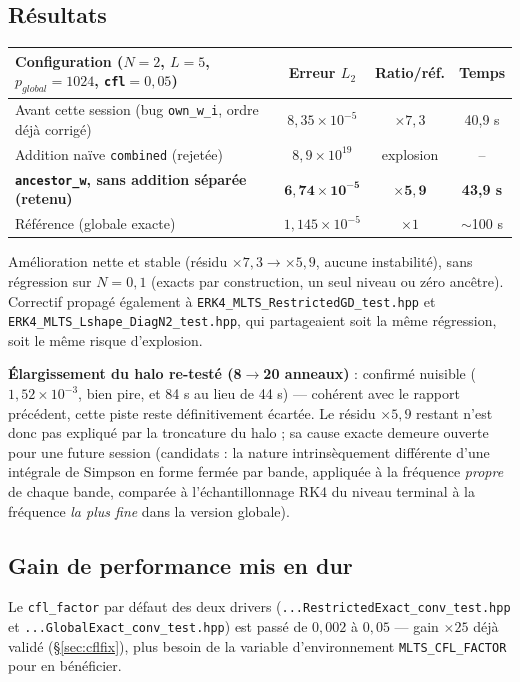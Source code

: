 \documentclass[11pt]{article}
\begin{document}
\subsection{Résultats}

\begin{center}
\begin{tabular}{@{}lccc@{}}
\toprule
Configuration ($N=2$, $L=5$, $p_{global}=1024$, \texttt{cfl}$=0{,}05$) & Erreur $L_2$ & Ratio/réf. & Temps \\
\midrule
Avant cette session (bug \texttt{own\_w\_i}, ordre déjà corrigé) & $8{,}35\times10^{-5}$ & $\times7{,}3$ & 40,9 s \\
Addition naïve \texttt{combined} (rejetée) & $8{,}9\times10^{19}$ & explosion & -- \\
\textbf{\texttt{ancestor\_w}, sans addition séparée (retenu)} & $\mathbf{6{,}74\times10^{-5}}$ & $\mathbf{\times5{,}9}$ & \textbf{43,9 s} \\
Référence (globale exacte) & $1{,}145\times10^{-5}$ & $\times1$ & $\sim$100 s \\
\bottomrule
\end{tabular}
\end{center}

Amélioration nette et stable (résidu $\times7{,}3\to\times5{,}9$, aucune
instabilité), sans régression sur $N=0,1$ (exacts par construction, un
seul niveau ou zéro ancêtre). Correctif propagé également à
\texttt{ERK4\_MLTS\_RestrictedGD\_test.hpp} et
\texttt{ERK4\_MLTS\_Lshape\_DiagN2\_test.hpp}, qui partageaient soit la
même régression, soit le même risque d'explosion.

\textbf{Élargissement du halo re-testé (8$\to$20 anneaux)} : confirmé
nuisible ($1{,}52\times10^{-3}$, bien pire, et 84 s au lieu de 44 s) ---
cohérent avec le rapport précédent, cette piste reste définitivement
écartée. Le résidu $\times5{,}9$ restant n'est donc pas expliqué par la
troncature du halo ; sa cause exacte demeure ouverte pour une future
session (candidats : la nature intrinsèquement différente d'une
intégrale de Simpson en forme fermée par bande, appliquée à la
fréquence \emph{propre} de chaque bande, comparée à l'échantillonnage
RK4 du niveau terminal à la fréquence \emph{la plus fine} dans la
version globale).

\subsection{Gain de performance mis en dur}

Le \texttt{cfl\_factor} par défaut des deux drivers
(\texttt{...RestrictedExact\_conv\_test.hpp} et
\texttt{...GlobalExact\_conv\_test.hpp}) est passé de $0{,}002$ à
$0{,}05$ --- gain $\times25$ déjà validé (\S\ref{sec:cflfix}), plus
besoin de la variable d'environnement \texttt{MLTS\_CFL\_FACTOR} pour
en bénéficier.
\end{document}

